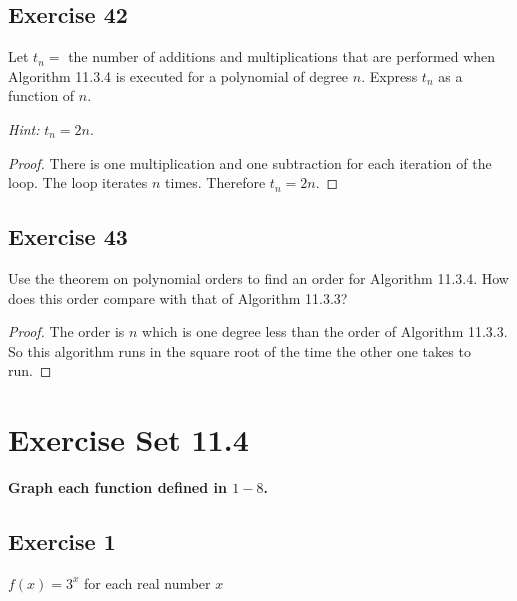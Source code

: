 \documentclass[14pt]{extarticle}
\newcommand{\cy}{\color{cyan}}
\begin{document}
\subsection{Exercise 42}
Let \(t_n =\) the number of additions and multiplications that are performed when Algorithm 11.3.4 is executed for a
polynomial of degree \(n\). Express \(t_n\) as a function of \(n\).

    {\it Hint:} \(t_n = 2n\).

\begin{proof}
    There is one multiplication and one subtraction for each iteration of the loop. The loop iterates \(n\) times.
    Therefore \(t_n = 2n\).
\end{proof}

\subsection{Exercise 43}
Use the theorem on polynomial orders to find an order for Algorithm 11.3.4. How does this order compare with that of
Algorithm 11.3.3?

\begin{proof}
    The order is \(n\) which is one degree less than the order of Algorithm 11.3.3. So this algorithm runs in the square root of
    the time the other one takes to run.
\end{proof}

\section{Exercise Set 11.4}
 {\bf \cy Graph each function defined in \(1-8\).}

\subsection{Exercise 1}
\(f(x) = 3^x\) for each real number \(x\)
\end{document}
